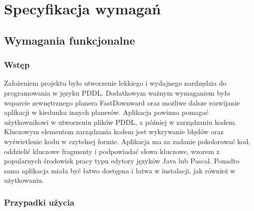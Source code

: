 \chapter{Specyfikacja wymagań}
\label{sec:specyfikacja}
\section{Wymagania funkcjonalne}
\subsection{Wstęp}
Założeniem projektu było utworzenie lekkiego i wydajnego nardzędzia do programowania w języku PDDL. Dodatkowym ważnym wymaganiem było wsparcie zewnętrznego planera FastDownward oraz możliwe dalsze rozwijanie aplikacji w kiedunku innych planerów. Aplikacja powinna pomagać użytkownikowi w utworzeniu plików PDDL, a później w zarządzaniu kodem. Kluczowym elementem zarządzania kodem jest wykrywanie błędów oraz wyświetlenie kodu w czytelnej formie. Aplikacja ma za zadanie pokolorować kod, oddzielić kluczowe fragmenty i podpowiadać słowa kluczowe, wzorem z popularnych środowisk pracy typu edytory języków Java lub Pascal. Ponadto sama aplikacja miała być łatwo dostępna i łatwa w instalacji, jak również w użytkowaniu.
\subsection{Przypadki użycia}
